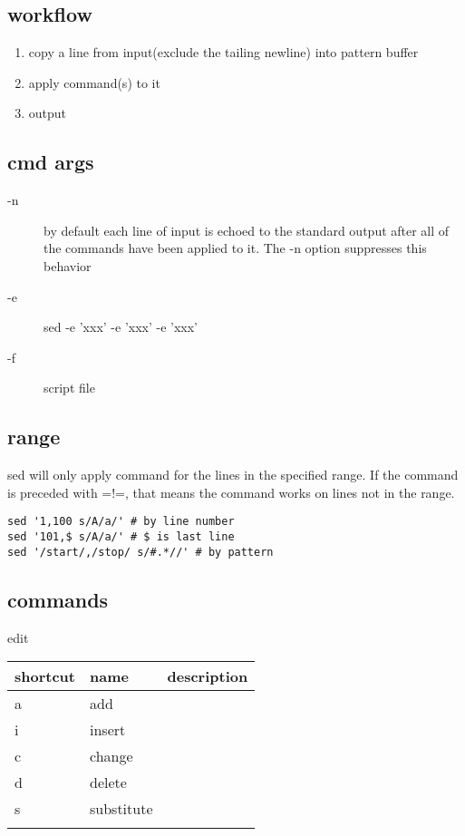 \subsection{workflow}
\begin{enumerate}
\item copy a line from input(exclude the tailing newline) into pattern buffer
\item apply command(s) to it
\item output
\end{enumerate}

\subsection{cmd args}
\begin{description}
\item [-n] by default each line of input is echoed to the standard
  output after all of the commands have been applied to it. The -n
  option suppresses this behavior
\item [-e] sed -e 'xxx' -e 'xxx' -e 'xxx'
\item [-f] script file
\end{description}


\subsection{range}
sed will only apply command for the lines in the specified range.
If the command is preceded with =!=, that means the command works on lines not in the range.

\begin{lstlisting}
sed '1,100 s/A/a/' # by line number
sed '101,$ s/A/a/' # $ is last line
sed '/start/,/stop/ s/#.*//' # by pattern
\end{lstlisting}

\subsection{commands}

edit
\begin{tabular}{l|l|l}
shortcut & name & description\\
\hline
a & add & \\
i & insert & \\
c & change & \\
d & delete & \\
s & substitute & \\
 &  & \\
\end{tabular}

